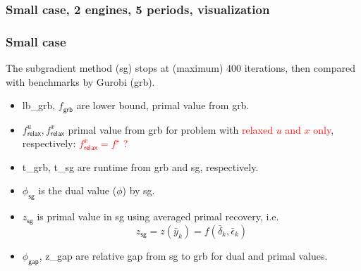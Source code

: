 \begin{frame}
  \frametitle{Small case, 2 engines, 5 periods, visualization}
  \begin{figure}
  \end{figure}
\end{frame}

\begin{frame}
  \frametitle{Small case}

  The subgradient method (sg) stops at (maximum) 400 iterations, then compared with benchmarks by Gurobi (grb).
  \begin{itemize}
    \item lb\_grb, \(f_{\textsf{grb}}\)  are lower bound, primal value from grb.
    \item \(f^u_{\textsf{relax}}, f^x_{\textsf{relax}}\) primal value from grb for problem with \textcolor{red}{relaxed \(u\) and \(x\) only}, respectively: \textcolor{red}{\(f^x_{\textsf{relax}} = f^\star\) ?}
    \item t\_grb, t\_sg are runtime from grb and sg, respectively.
    \item \(\phi_{\textsf{sg}}\) is the dual value (\(\phi\)) by sg.
    \item \(z_{\textsf{sg}}\) is primal value in sg using averaged primal recovery, i.e.
          \[z_{\textsf{sg}} = z(\bar y_k) = f(\bar \delta_k, \bar \epsilon_k)\]
    \item \(\phi_{\textsf{gap}}\), z\_gap are relative gap from sg to grb for dual and primal values.
  \end{itemize}
\end{frame}

